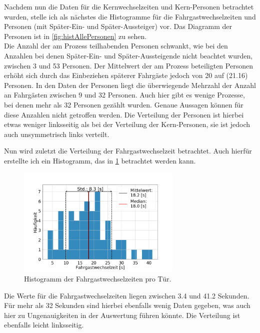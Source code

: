 Nachdem nun die Daten für die Kernwechselzeiten und Kern-Personen betrachtet wurden, stelle ich als nächstes die Histogramme für die Fahrgastwechselzeiten und Personen (mit Später-Ein- und Später-Aussteiger) vor. Das Diagramm der Personen ist in \figurename \ref{fig:histAllePersonen} zu sehen. \\
Die Anzahl der am Prozess teilhabenden Personen schwankt, wie bei den Anzahlen bei denen Später-Ein- und Später-Aussteigende nicht beachtet wurden, zwischen 3 und 53 Personen. Der Mittelwert der am Prozess beteiligten Personen erhöht sich durch das Einbeziehen späterer Fahrgäste jedoch von 20 auf  (21.16) Personen. In den Daten der Personen liegt die überwiegende Mehrzahl der Anzahl an Fahrgästen zwischen 9 und 32 Personen. Auch hier gibt es wenige Prozesse, bei denen mehr als 32 Personen gezählt wurden. Genaue Aussagen können für diese Anzahlen nicht getroffen werden. Die Verteilung der Personen ist hierbei etwas weniger linksseitig als bei der Verteilung der Kern-Personen, sie ist jedoch auch unsymmetrisch links verteilt.

Nun wird zuletzt die Verteilung der Fahrgastwechselzeit betrachtet. Auch hierfür erstellte ich ein Histogramm, das in \figurename \ref{fig:histAllTimes} betrachtet werden kann.
\begin{figure}[H]
	\centering
	\includegraphics[width=0.7\textwidth]{pictures/data_evaluation/transferTime/hist_transfer_times.png}
	\caption{Histogramm der Fahrgastwechselzeiten pro Tür.}
	\label{fig:histAllTimes}
\end{figure}
Die Werte für die Fahrgastwechselzeiten liegen zwischen 3.4 und 41.2 Sekunden. Für mehr als 32 Sekunden sind hierbei ebenfalls wenig Daten gegeben, was auch hier zu Ungenauigkeiten in der Auswertung führen könnte. Die Verteilung ist ebenfalls leicht linksseitig.

